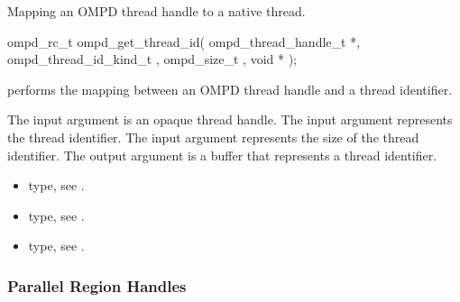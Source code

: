 \label{subsubsubsec:ompd_get_thread_id}
\summary
Mapping an OMPD thread handle to a native thread.

\newpage %
\format
\begin{cspecific}
\begin{ompSyntax}
ompd_rc_t ompd_get_thread_id(
  ompd_thread_handle_t *,
  ompd_thread_id_kind_t ,
  ompd_size_t ,
  void *
);
\end{ompSyntax}
\end{cspecific}

\descr
{} performs the mapping between an OMPD
thread handle and a thread identifier.

\argdesc

The input argument  is an opaque thread handle.
The input argument   represents the thread
identifier. The input argument  represents the size of the 
thread identifier. The output argument  is a buffer that represents a thread identifier.



\crossreferences
\begin{itemize}
	\item {} type, see .
	\item {} type, see .
	\item {} type, see .
\end{itemize}

\subsubsection{Parallel Region Handles}

